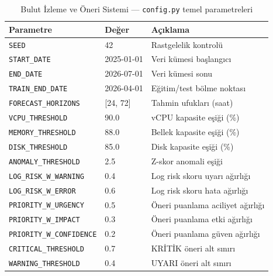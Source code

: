 \begin{ekler}
\begin{table}[htbp]
    \centering
    \caption{Bulut İzleme ve Öneri Sistemi — \texttt{config.py} temel parametreleri}
    \label{tab:ek-config}
    \begin{tabular}{p{5.2cm}p{3.5cm}p{4.5cm}}
        \textbf{Parametre} & \textbf{Değer} & \textbf{Açıklama} \\
        \hline
        \texttt{SEED}                   & 42              & Rastgelelik kontrolü \\
        \texttt{START\_DATE}             & 2025-01-01      & Veri kümesi başlangıcı \\
        \texttt{END\_DATE}               & 2026-07-01      & Veri kümesi sonu \\
        \texttt{TRAIN\_END\_DATE}        & 2026-04-01      & Eğitim/test bölme noktası \\
        \texttt{FORECAST\_HORIZONS}      & [24, 72]        & Tahmin ufukları (saat) \\
        \texttt{VCPU\_THRESHOLD}         & 90.0            & vCPU kapasite eşiği (\%) \\
        \texttt{MEMORY\_THRESHOLD}       & 88.0            & Bellek kapasite eşiği (\%) \\
        \texttt{DISK\_THRESHOLD}         & 85.0            & Disk kapasite eşiği (\%) \\
        \texttt{ANOMALY\_THRESHOLD}      & 2.5             & Z-skor anomali eşiği \\
        \texttt{LOG\_RISK\_W\_WARNING}   & 0.4             & Log risk skoru uyarı ağırlığı \\
        \texttt{LOG\_RISK\_W\_ERROR}     & 0.6             & Log risk skoru hata ağırlığı \\
        \texttt{PRIORITY\_W\_URGENCY}    & 0.5             & Öneri puanlama aciliyet ağırlığı \\
        \texttt{PRIORITY\_W\_IMPACT}     & 0.3             & Öneri puanlama etki ağırlığı \\
        \texttt{PRIORITY\_W\_CONFIDENCE} & 0.2             & Öneri puanlama güven ağırlığı \\
        \texttt{CRITICAL\_THRESHOLD}     & 0.7             & KRİTİK öneri alt sınırı \\
        \texttt{WARNING\_THRESHOLD}      & 0.4             & UYARI öneri alt sınırı \\
    \end{tabular}
\end{table}

\end{ekler}
